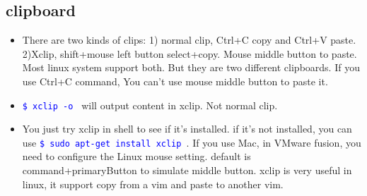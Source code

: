 \documentclass[a4paper,11pt,twoside]{book}
\newcommand{\linuxcommand}[1]{\texttt{\textcolor{blue}{\$ #1 \Pisymbol{psy}{191}}}}
\begin{document}
\subsection{clipboard}
	\begin{itemize}
			\item There are two kinds of clips: 1) normal clip, Ctrl+C copy and Ctrl+V paste. 2)Xclip, shift+mouse left button select+copy. Mouse middle button to paste. Most linux system support both. But they are two different clipboards. If you use Ctrl+C command, You can't use mouse middle button to paste it.
			
			\item \linuxcommand{xclip -o} will output content in xclip. Not normal clip.
					
			\item You just try xclip in shell to see if it's installed. if it's not installed, you can use \linuxcommand{sudo apt-get install xclip}. If you use Mac, in VMware fusion, you need to configure the Linux mouse setting.  default is command+primaryButton to simulate middle button.  xclip is very useful in linux, it support copy from a vim and paste to another vim.  

	\end{itemize}
\end{document}
